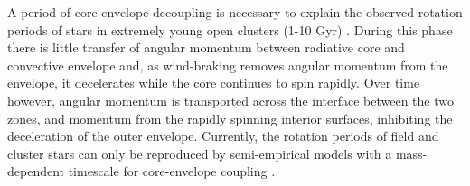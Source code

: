 A period of core-envelope decoupling is necessary to explain the observed
rotation periods of stars in extremely young open clusters (1-10 Gyr)
\citep[\eg][]{irwin2007, bouvier2008, denissenkov2010, spada2011, reiners2012,
gallet2013}.
During this phase there is little transfer of angular momentum between
radiative core and convective envelope and, as wind-braking removes angular
momentum from the envelope, it decelerates while the core continues to spin
rapidly.
Over time however, angular momentum is transported across the interface
between the two zones, and momentum from the rapidly spinning interior
surfaces, inhibiting the deceleration of the outer envelope.
Currently, the rotation periods of field and cluster stars can only be
reproduced by semi-empirical models with a mass-dependent timescale for
core-envelope coupling \citep[][Angus \etal, 2020]{spada2019, curtis2019}.

